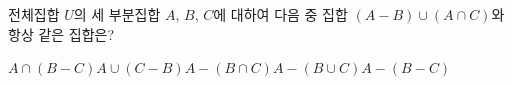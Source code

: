 전체집합 $U$의 세 부분집합 $A$, $B$, $C$에 대하여 다음 중 집합 $(A-B)\cup(A\cap C)$와 항상 같은 집합은?
\begin{choicesii}{$A\cap(B-C)$}{$A\cup(C-B)$}{$A-(B\cap C)$}{$A-(B\cup C)$}{$A-(B-C)$}\end{choicesii}
